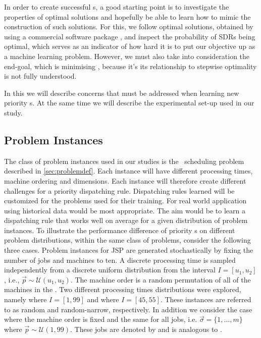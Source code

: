 \documentclass[smallextended]{svjour3}
\begin{document}
In order to create successful \dr s, a good starting point is to 
investigate the properties of optimal solutions and hopefully be able to learn 
how to mimic the construction of such solutions. For this, we follow optimal solutions, 
obtained by using a commercial software package \cite{gurobi}, and inspect 
the probability of SDRs being optimal, which serves as an indicator of how hard 
it is to put our objective up as a machine learning problem. 
However, we must also take into consideration the end-goal, which is minimising 
\namerho, because it's its relationship to stepwise optimality is not fully 
understood.


In this  we will describe concerns that must be 
addressed when learning new priority \dr s. At the same time we will describe 
the experimental set-up used in our study. 

\subsection{Problem Instances}\label{sec:data:sim}

The class of problem instances used in our studies is the \jsp\ scheduling 
problem described in \cref{sec:problemdef}. Each instance will have 
different processing times, machine ordering and dimensions. Each instance will 
therefore create different challenges for a priority dispatching rule. 
Dispatching rules learned will be customized for the problems used for their 
training. For real world application using historical data would be most 
appropriate. The aim would be to learn a dispatching rule that works well on 
average for a given distribution of problem instances. To illustrate the performance 
difference of priority \dr s on different problem distributions, 
within the same class of problems, consider the following three cases.
Problem instances for JSP are generated stochastically by fixing the number of 
jobs and machines to ten. A discrete processing time is sampled independently 
from a discrete uniform distribution from the interval $I=[u_1,u_2]$, i.e., 
$\vec{p}\sim \mathcal{U}(u_1,u_2)$. 
The machine order is a random permutation of all of the machines in the 
\jsp. Two different processing times distributions were explored, namely 
 where $I=[1,99]$ and  where $I=[45,55]$. These 
instances are referred to as random and random-narrow, respectively. In 
addition we consider the case where the machine order is fixed and the same for 
all jobs, i.e. $\vec{\sigma}=\{1,\ldots,m\}$ where 
$\vec{p}\sim\mathcal{U}(1,99)$. 
These jobs are denoted by  and is analogous to .
\end{document}
